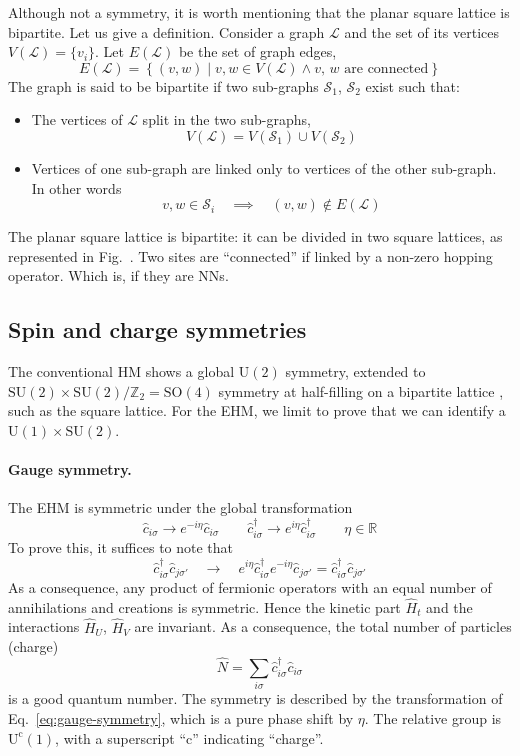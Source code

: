 Although not a symmetry, it is worth mentioning that the planar square lattice is bipartite. Let us give a definition. Consider a graph $\mathcal{L}$ and the set of its vertices $V(\mathcal{L}) = \lbrace v_i \rbrace$. Let $E(\mathcal{L})$ be the set of graph edges,
\[
	E(\mathcal{L}) = \left\lbrace (v,w) \mid v,w \in V(\mathcal{L}) \land \text{$v$, $w$ are connected} \right\rbrace
\]
The graph is said to be bipartite if two sub-graphs $\mathcal{S}_1$, $\mathcal{S}_2$ exist such that:
\begin{itemize}
	\item The vertices of $\mathcal{L}$ split in the two sub-graphs,
	\[
		V(\mathcal{L}) = V(\mathcal{S}_1) \cup V(\mathcal{S}_2)
	\]
	\item Vertices of one sub-graph are linked only to vertices of the other sub-graph. In other words
	\[
		v,w \in \mathcal{S}_i
		\quad\implies\quad
		(v,w) \notin E(\mathcal{L})
	\]
\end{itemize}
The planar square lattice is bipartite: it can be divided in two square lattices, as represented in Fig.~\mref. Two sites are ``connected'' if linked by a non-zero hopping operator. Which is, if they are NNs.

\subsection{Spin and charge symmetries}\label{subsec:spin-charge-syms}

The conventional HM shows a global $\mathrm{U}(2)$ symmetry, extended to $\mathrm{SU}(2) \times \mathrm{SU}(2) / \mathbb{Z}_2 = \mathrm{SO}(4)$ symmetry at half-filling on a bipartite lattice \cite{arovas2022hubbard}, such as the square lattice. For the EHM, we limit to prove that we can identify a $\mathrm{U}(1) \times \mathrm{SU}(2)$.

\paragraph{Gauge symmetry.} The EHM is symmetric under the global transformation
\begin{equation}\label{eq:gauge-symmetry}
	\hat c_{i\sigma} \to e^{-i\eta} \hat c_{i\sigma}
	\qquad
	\hat c_{i\sigma}^\dagger \to e^{i\eta} \hat c_{i\sigma}^\dagger
	\qquad
	\eta \in \mathbb{R}
\end{equation}
To prove this, it suffices to note that
\[
	\hat c_{i\sigma}^\dagger \hat c_{j\sigma'}
	\quad\to\quad
	e^{i\eta} \hat c_{i\sigma}^\dagger e^{-i\eta} \hat c_{j\sigma'} = \hat c_{i\sigma}^\dagger \hat c_{j\sigma'}
\]
As a consequence, any product of fermionic operators with an equal number of annihilations and creations is symmetric. Hence the kinetic part $\hat H_t$ and the interactions $\hat H_U$, $\hat H_V$ are invariant. As a consequence, the total number of particles (charge)
\[
	\hat{N} = \sum_{i\sigma} \hat c_{i\sigma}^\dagger \hat c_{i\sigma}
\]
is a good quantum number. The symmetry is described by the transformation of Eq.~\eqref{eq:gauge-symmetry}, which is a pure phase shift by $\eta$. The relative group is $\mathrm{U}^\mathrm{c}(1)$, with a superscript ``$\mathrm{c}$'' indicating ``charge''.

